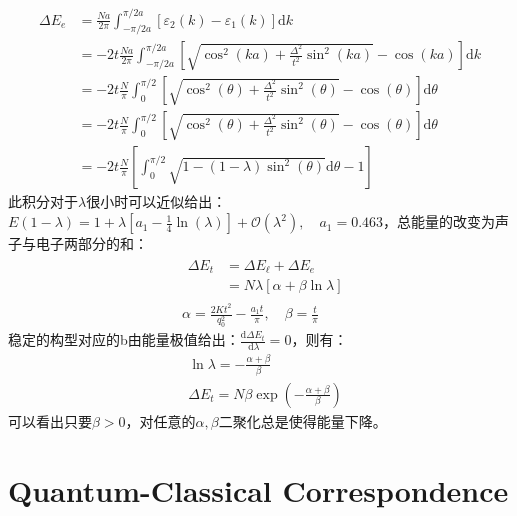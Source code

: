 \documentclass[10pt,openany]{book}
\theoremstyle{thmstyle} %
\theoremstyle{defstyle} %
\theoremstyle{prostyle} %
\begin{document}
\begin{equation}
	\begin{aligned}
		\Delta E_e & =\frac{N a}{2 \pi} \int_{-\pi / 2 a}^{\pi / 2 a}\left[\varepsilon_2(k)-\varepsilon_1(k)\right] \mathrm{d} k \\
		& =-2 t \frac{N a}{2 \pi} \int_{-\pi / 2 a}^{\pi / 2 a}\left[\sqrt{\cos ^2(k a)+\frac{\Delta^2}{t^2} \sin ^2(k a)}-\cos (k a)\right] \mathrm{d} k \\
		& =-2 t \frac{N}{\pi} \int_0^{\pi / 2}\left[\sqrt{\cos ^2(\theta)+\frac{\Delta^2}{t^2} \sin ^2(\theta)}-\cos (\theta)\right] \mathrm{d} \theta \\
		& =-2 t \frac{N}{\pi} \int_0^{\pi / 2}\left[\sqrt{\cos ^2(\theta)+\frac{\Delta^2}{t^2} \sin ^2(\theta)}-\cos (\theta)\right] \mathrm{d} \theta \\
		& =-2 t \frac{N}{\pi}\left[\int_0^{\pi / 2} \sqrt{1-(1-\lambda) \sin ^2(\theta)} \mathrm{d} \theta-1\right]
		\end{aligned}
\end{equation}
此积分对于$ \lambda $很小时可以近似给出：$ E(1-\lambda)=1+\lambda\left[a_1-\frac{1}{4} \ln (\lambda)\right]+\mathcal{O}\left(\lambda^2\right), \quad a_1=0.463 $，总能量的改变为声子与电子两部分的和：  
\begin{equation}
	\begin{aligned}
		&\begin{aligned}
		\Delta E_t & =\Delta E_{\ell}+\Delta E_e \\
		& =N \lambda[\alpha+\beta \ln \lambda]
		\end{aligned}\\
		&\alpha=\frac{2 K t^2}{q_0^2}-\frac{a_1 t}{\pi}, \quad \beta=\frac{t}{\pi}
		\end{aligned}
\end{equation}
稳定的构型对应的b由能量极值给出：$ \frac{\mathrm{d} \Delta E_t}{\mathrm{~d} \lambda}=0 $，则有：
\begin{equation}
	\begin{aligned}
		& \ln \lambda=-\frac{\alpha+\beta}{\beta} \\
		& \Delta E_t=N \beta \exp \left(-\frac{\alpha+\beta}{\beta}\right)
		\end{aligned}
\end{equation} 
可以看出只要$ \beta>0 $，对任意的$ \alpha,\beta $二聚化总是使得能量下降。  

\section{Quantum-Classical Correspondence}
\end{document}
